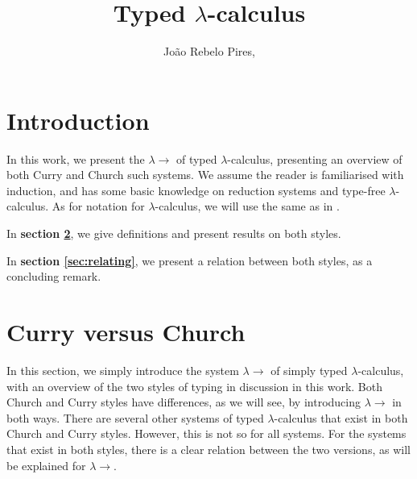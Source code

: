 \documentclass{llncs}
\newcommand{\lambdasystem}[0]{{\lambda}{\rightarrow}}
\theoremstyle{definition}
\numberwithin{mydef}{subsection}
\theoremstyle{plain}
\theoremstyle{remark}
\begin{document}
	\title{Typed $\lambda$-calculus}

	\author{João Rebelo Pires, }


	\maketitle
		
	\section{Introduction}\label{sec:intro}
	
	In this work, we present the $\lambdasystem$ of typed $\lambda$-calculus, presenting an overview of both Curry and Church such systems.
	We assume the reader is familiarised with induction, and has some basic knowledge on reduction systems and type-free $\lambda$-calculus. As for notation for $\lambda$-calculus, we will use the same as in \cite{henkbarendregt1991}.
	
	In \textbf{section \ref{sec:vs}}, we give definitions and present results on both styles.
	
	In \textbf{section \ref{sec:relating}}, we present a relation between both styles, as a concluding remark.

	\section{Curry versus Church}\label{sec:vs}
	
	In this section, we simply introduce the system $\lambdasystem$ of simply typed $\lambda$-calculus, with an overview of the two styles of typing in discussion in this work.
	Both Church and Curry styles have differences, as we will see, by introducing $\lambdasystem$ in both ways.
	There are several other systems of typed $\lambda$-calculus that exist in both Church and Curry styles.
	However, this is not so for all systems.
	For the systems that exist in both styles, there is a clear relation between the two versions, as will be explained for $\lambdasystem$.
	
\end{document}
